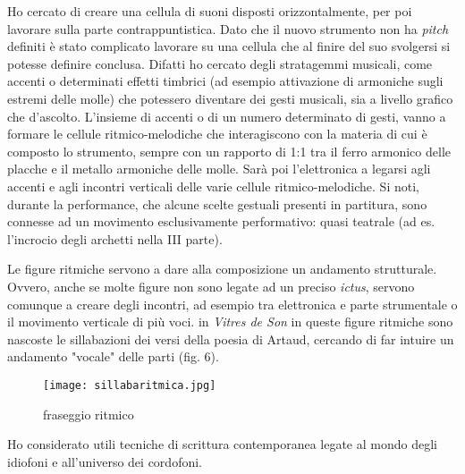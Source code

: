 Ho cercato di creare una cellula di suoni disposti orizzontalmente, per poi lavorare sulla parte contrappuntistica. Dato che il nuovo strumento non ha \textit{pitch} definiti è stato complicato lavorare su una cellula che al finire del suo svolgersi si potesse definire conclusa. Difatti ho cercato degli stratagemmi musicali, come accenti o determinati effetti timbrici (ad esempio attivazione di armoniche sugli estremi delle molle) che potessero diventare dei gesti musicali, sia a livello grafico che d'ascolto. L'insieme di accenti o di un numero determinato di gesti, vanno a formare le cellule ritmico-melodiche che interagiscono con la materia di cui è composto lo strumento, sempre con un rapporto di 1:1 tra il ferro armonico delle placche e il metallo armoniche delle molle.
Sarà poi l'elettronica a legarsi agli accenti e agli incontri verticali delle varie cellule ritmico-melodiche. Si noti, durante la performance, che alcune scelte gestuali presenti in partitura, sono connesse ad un movimento esclusivamente performativo: quasi teatrale (ad es. l'incrocio degli archetti nella III parte).

Le figure ritmiche servono a dare alla composizione un andamento strutturale. Ovvero, anche se molte figure non sono legate ad un preciso \textit{ictus}, servono comunque a creare degli incontri, ad esempio tra elettronica e parte strumentale o il movimento verticale di più voci. in \textit{Vitres de Son} in queste figure ritmiche sono nascoste le sillabazioni dei versi della poesia di Artaud, cercando di far intuire un andamento "vocale" delle parti (fig. 6).


\begin{figure}[htbp]
\begin{center}
\texttt{[image: sillabaritmica.jpg]}
\caption{fraseggio ritmico}
\label{default}
\end{center}
\end{figure}

Ho considerato utili tecniche di scrittura contemporanea legate al mondo degli idiofoni e all'universo dei cordofoni.

